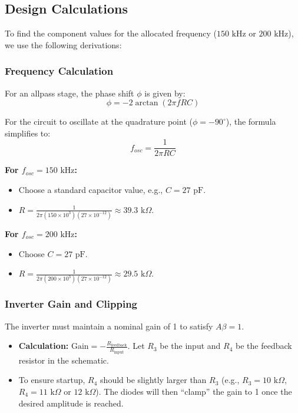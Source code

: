 \documentclass[conference]{IEEEtran}
\begin{document}
\subsection{Design Calculations}
To find the component values for the allocated frequency ($150\text{ kHz}$ or $200\text{ kHz}$), we use the following derivations:

\subsubsection{Frequency Calculation}
For an allpass stage, the phase shift $\phi$ is given by:
\begin{equation}
\phi = -2 \arctan(2\pi f RC)
\end{equation}

For the circuit to oscillate at the quadrature point ($\phi = -90^\circ$), the formula simplifies to:
\begin{equation}
f_{osc} = \frac{1}{2\pi RC}
\end{equation}

\textbf{For $f_{osc} = 150\text{ kHz}$:}
\begin{itemize}
    \item Choose a standard capacitor value, e.g., $C = 27\text{ pF}$.
    \item $R = \frac{1}{2\pi (150 \times 10^3)(27 \times 10^{-12})} \approx 39.3\text{ k}\Omega$.
\end{itemize}

\textbf{For $f_{osc} = 200\text{ kHz}$:}
\begin{itemize}
    \item Choose $C = 27\text{ pF}$.
    \item $R = \frac{1}{2\pi (200 \times 10^3)(27 \times 10^{-12})} \approx 29.5\text{ k}\Omega$.
\end{itemize}

\subsubsection{Inverter Gain and Clipping}
The inverter must maintain a nominal gain of 1 to satisfy $A\beta = 1$.
\begin{itemize}
    \item \textbf{Calculation:} $\text{Gain} = -\frac{R_{\text{feedback}}}{R_{\text{input}}}$. Let $R_3$ be the input and $R_4$ be the feedback resistor in the schematic.
    \item To ensure startup, $R_4$ should be slightly larger than $R_3$ (e.g., $R_3 = 10\text{ k}\Omega$, $R_4 = 11\text{ k}\Omega$ or $12\text{ k}\Omega$). The diodes will then ``clamp'' the gain to 1 once the desired amplitude is reached.
\end{itemize}
\end{document}
